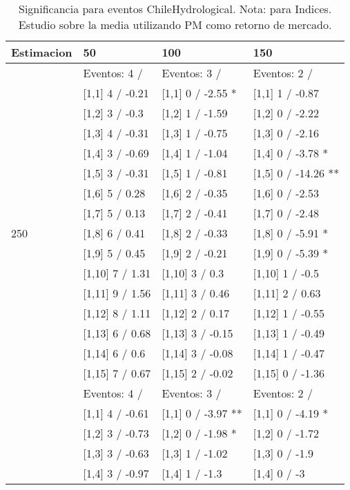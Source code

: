 \begin{table}

\caption{Significancia para eventos ChileHydrological. Nota: para Indices. Estudio sobre la media utilizando PM como retorno de mercado.}
\centering
\begin{tabular}[t]{llll}
\toprule
Estimacion & 50 & 100 & 150\\
\midrule
 & Eventos:  4 / & Eventos:  3 / & Eventos:  2 /\\
 & {}[1,1] 4  / -0.21 & {}[1,1] 0  / -2.55 * & {}[1,1] 1  / -0.87\\
 & {}[1,2] 3  / -0.3 & {}[1,2] 1  / -1.59 & {}[1,2] 0  / -2.22\\
 & {}[1,3] 4  / -0.31 & {}[1,3] 1  / -0.75 & {}[1,3] 0  / -2.16\\
 & {}[1,4] 3  / -0.69 & {}[1,4] 1  / -1.04 & {}[1,4] 0  / -3.78 *\\
\addlinespace
 & {}[1,5] 3  / -0.31 & {}[1,5] 1  / -0.81 & {}[1,5] 0  / -14.26 **\\
 & {}[1,6] 5  / 0.28 & {}[1,6] 2  / -0.35 & {}[1,6] 0  / -2.53\\
 & {}[1,7] 5  / 0.13 & {}[1,7] 2  / -0.41 & {}[1,7] 0  / -2.48\\
250 & {}[1,8] 6  / 0.41 & {}[1,8] 2  / -0.33 & {}[1,8] 0  / -5.91 *\\
 & {}[1,9] 5  / 0.45 & {}[1,9] 2  / -0.21 & {}[1,9] 0  / -5.39 *\\
\addlinespace
 & {}[1,10] 7  / 1.31 & {}[1,10] 3  / 0.3 & {}[1,10] 1  / -0.5\\
 & {}[1,11] 9  / 1.56 & {}[1,11] 3  / 0.46 & {}[1,11] 2  / 0.63\\
 & {}[1,12] 8  / 1.11 & {}[1,12] 2  / 0.17 & {}[1,12] 1  / -0.55\\
 & {}[1,13] 6  / 0.68 & {}[1,13] 3  / -0.15 & {}[1,13] 1  / -0.49\\
 & {}[1,14] 6  / 0.6 & {}[1,14] 3  / -0.08 & {}[1,14] 1  / -0.47\\
\addlinespace
 & {}[1,15] 7  / 0.67 & {}[1,15] 2  / -0.02 & {}[1,15] 0  / -1.36\\
 & Eventos:  4 / & Eventos:  3 / & Eventos:  2 /\\
 & {}[1,1] 4  / -0.61 & {}[1,1] 0  / -3.97 ** & {}[1,1] 0  / -4.19 *\\
 & {}[1,2] 3  / -0.73 & {}[1,2] 0  / -1.98 * & {}[1,2] 0  / -1.72\\
 & {}[1,3] 3  / -0.63 & {}[1,3] 1  / -1.02 & {}[1,3] 0  / -1.9\\
\addlinespace
 & {}[1,4] 3  / -0.97 & {}[1,4] 1  / -1.3 & {}[1,4] 0  / -3\\

\end{tabular}
\end{table}
